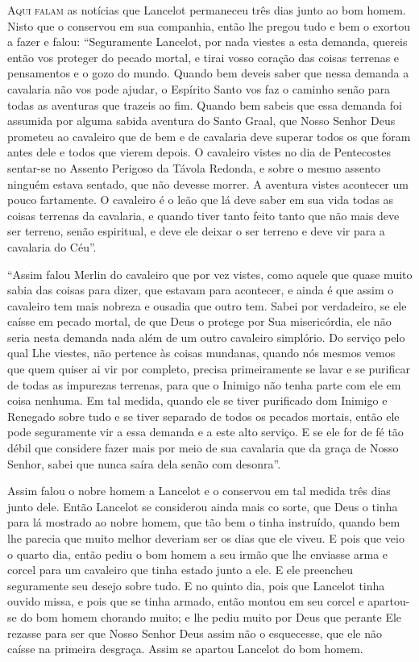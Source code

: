 \textsc{Aqui falam} as notícias que Lancelot permaneceu três dias junto ao bom homem. 
Nisto que o conservou em sua companhia, então lhe pregou tudo e bem o
exortou a fazer e falou: “Seguramente Lancelot, por nada viestes a esta
demanda, quereis então vos proteger do pecado mortal, e tirai vosso coração das
coisas terrenas e pensamentos e o gozo do mundo. Quando bem deveis
saber que nessa demanda a cavalaria não vos pode ajudar, o Espírito Santo vos
faz o caminho senão para todas as aventuras que trazeis ao fim. Quando bem
sabeis que essa demanda foi assumida por alguma sabida aventura do Santo Graal,
que Nosso Senhor Deus prometeu ao cavaleiro que de bem e de cavalaria deve
superar todos os que foram antes dele e todos que vierem depois. O cavaleiro
vistes no dia de Pentecostes sentar-se no Assento Perigoso da Távola Redonda, e
sobre o mesmo assento ninguém estava sentado, que não devesse morrer. A
aventura vistes acontecer um pouco fartamente. O cavaleiro é o leão que lá deve
saber em sua vida todas as coisas terrenas da cavalaria, e quando tiver tanto
feito tanto que não mais deve ser terreno, senão espiritual, e deve ele deixar
o ser terreno e deve vir para a cavalaria do Céu”. 

“Assim falou Merlin do cavaleiro que por vez vistes, como aquele que quase
muito sabia das coisas para dizer, que estavam para acontecer, e ainda é que
assim o cavaleiro tem mais nobreza e ousadia que outro tem. Sabei por
verdadeiro, se ele caísse em pecado mortal, de que Deus o protege por Sua
misericórdia, ele não seria nesta demanda nada além de um outro cavaleiro
simplório. Do serviço pelo qual Lhe viestes, não pertence às coisas mundanas,
quando nós mesmos vemos que quem quiser ai vir por completo, precisa
primeiramente se lavar e se purificar de todas as impurezas terrenas, para que
o Inimigo não tenha parte com ele em coisa nenhuma. Em tal medida, quando ele
se tiver purificado dom Inimigo e Renegado sobre tudo e se tiver separado de
todos os pecados mortais, então ele pode seguramente vir a essa demanda e a
este alto serviço. E se ele for de fé tão débil que considere fazer mais por
meio de sua cavalaria que da graça de Nosso Senhor, sabei que nunca saíra dela
senão com desonra”. 

Assim falou o nobre homem a Lancelot e o conservou em tal medida três dias
junto dele. Então Lancelot se considerou ainda mais co sorte, que Deus o tinha
para lá mostrado ao nobre homem, que tão bem o tinha instruído, quando bem lhe
parecia que muito melhor deveriam ser os dias que ele viveu. E pois que veio o
quarto dia, então pediu o bom homem a seu irmão que lhe enviasse arma e corcel
para um cavaleiro que tinha estado junto a ele. E ele preencheu seguramente seu
desejo sobre tudo. E no quinto dia, pois que Lancelot tinha ouvido missa, e
pois que se tinha armado, então montou em seu corcel e apartou-se do bom homem
chorando muito; e lhe pediu muito por Deus que perante Ele rezasse para ser que
Nosso Senhor Deus assim não o esquecesse, que ele não caísse na primeira
desgraça. Assim se apartou Lancelot do bom homem. 

